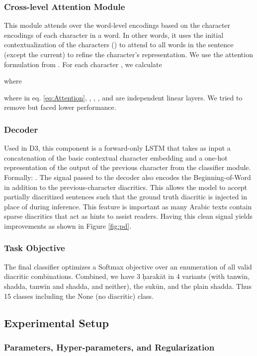 \documentclass[11pt]{article}
\begin{document}
\subsubsection{Cross-level Attention Module}
\label{arch:attn}
This module attends over the word-level encodings  based on the character encodings  of each character in a word. In other words, it uses the initial contextualization of the characters () to attend to all words in the sentence (except the current) to refine the character's representation. We use the attention formulation from \cite{attention}. For each character , we calculate 



where


 where in eq. \eqref{eq:Attention}, , , , and  are independent linear layers. We tried to remove  but faced lower performance.


\subsubsection{Decoder}
Used in D3, this component is a forward-only LSTM that takes as input a concatenation of the basic contextual character embedding  and a one-hot representation of the output of the previous character from the classifier module. Formally: . The  signal passed to the decoder also encodes the Beginning-of-Word in addition to the previous-character diacritics. This allows the model to accept partially diacritized sentences such that the ground truth diacritic is injected in place of  during inference. This feature is important as many Arabic texts contain sparse diacritics that act as hints to assist readers. Having this clean signal yields improvements as shown in Figure \ref{fig:pd}.

\subsubsection{Task Objective}
The final classifier optimizes a Softmax objective over an enumeration of all valid diacritic combinations. Combined, we have 3 \d{h}arakāt in 4 variants (with tanwīn, shadda, tanwīn and shadda, and neither), the sukūn, and the plain shadda. Thus 15 classes including the None (no diacritic) class.

\subsection{Experimental Setup}

\subsubsection{Parameters, Hyper-parameters, and Regularization}
\end{document}
